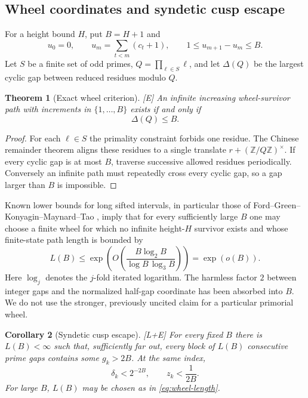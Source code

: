 \documentclass[11pt]{article}
\newtheorem{theorem}{Theorem}[section]
\newtheorem{corollary}[theorem]{Corollary}
\theoremstyle{definition}
\theoremstyle{remark}
\newcommand{\status}[1]{\textnormal{\textcolor{accent}{\footnotesize[#1]}}}
\begin{document}
\subsection{Wheel coordinates and syndetic cusp escape}

For a height bound $H$, put $B=H+1$ and
\[
 u_0=0,\qquad u_m=\sum_{t<m}(c_t+1),\qquad
 1\le u_{m+1}-u_m\le B.
\]
Let $S$ be a finite set of odd primes, $Q=\prod_{\ell\in S}\ell$, and let
$\Delta(Q)$ be the largest cyclic gap between reduced residues modulo $Q$.

\begin{theorem}[Exact wheel criterion]\label{thm:wheel-criterion}
\status{E}
An infinite increasing wheel-survivor path with increments in $\{1,\ldots,B\}$ exists
if and only if
\begin{equation}\label{eq:wheel-criterion}
 \Delta(Q)\le B.
\end{equation}
\end{theorem}

\begin{proof}
For each $\ell\in S$ the primality constraint forbids one residue.  The Chinese
remainder theorem aligns these residues to a single translate
$r+(\mathbb Z/Q\mathbb Z)^\times$.  If every cyclic gap is at most $B$, traverse
successive allowed residues periodically.  Conversely an infinite path must repeatedly
cross every cyclic gap, so a gap larger than $B$ is impossible.
\end{proof}

Known lower bounds for long sifted intervals, in particular those of
Ford--Green--Konyagin--Maynard--Tao \cite{FGKMT}, imply that for every sufficiently large
$B$ one may choose a finite wheel for which no infinite height-$H$ survivor exists and
whose finite-state path length is bounded by
\begin{equation}\label{eq:wheel-length}
 L(B)\le
 \exp\!\left(
 O\!\left(\frac{B\log_2B}{\log B\,\log_3B}\right)
 \right)=\exp(o(B)).
\end{equation}
Here $\log_j$ denotes the $j$-fold iterated logarithm.
The harmless factor $2$ between integer gaps and the normalized half-gap coordinate has
been absorbed into $B$.  We do not use the stronger, previously uncited claim for a
particular primorial wheel.

\begin{corollary}[Syndetic cusp escape]\label{cor:syndetic-cusp}
\status{L+E}
For every fixed $B$ there is $L(B)<\infty$ such that, sufficiently far out, every block
of $L(B)$ consecutive prime gaps contains some $g_k>2B$.  At the same index,
\begin{equation}\label{eq:syndetic-cusp}
 \delta_k<2^{-2B},\qquad z_k<\frac1{2B}.
\end{equation}
For large $B$, $L(B)$ may be chosen as in \eqref{eq:wheel-length}.
\end{corollary}
\end{document}
